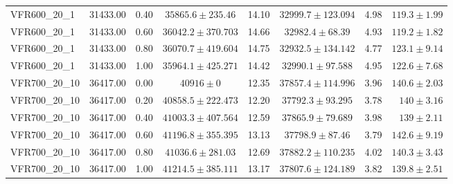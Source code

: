 \begin{longtable}{lrrccccr}
  VFR600\_20\_1 & 31433.00 & 0.40 & $35865.6 \pm 235.46$ & 14.10 & $32999.7 \pm 123.094$ & 4.98 & $119.3 \pm 1.99$ \\ 
  VFR600\_20\_1 & 31433.00 & 0.60 & $36042.2 \pm 370.703$ & 14.66 & $32982.4 \pm 68.39$ & 4.93 & $119.2 \pm 1.82$ \\ 
  VFR600\_20\_1 & 31433.00 & 0.80 & $36070.7 \pm 419.604$ & 14.75 & $32932.5 \pm 134.142$ & 4.77 & $123.1 \pm 9.14$ \\ 
  VFR600\_20\_1 & 31433.00 & 1.00 & $35964.1 \pm 425.271$ & 14.42 & $32990.1 \pm 97.588$ & 4.95 & $122.6 \pm 7.68$ \\ 
   \midrule
VFR700\_20\_10 & 36417.00 & 0.00 & $40916 \pm 0$ & 12.35 & $37857.4 \pm 114.996$ & 3.96 & $140.6 \pm 2.03$ \\ 
  VFR700\_20\_10 & 36417.00 & 0.20 & $40858.5 \pm 222.473$ & 12.20 & $37792.3 \pm 93.295$ & 3.78 & $140 \pm 3.16$ \\ 
  VFR700\_20\_10 & 36417.00 & 0.40 & $41003.3 \pm 407.564$ & 12.59 & $37865.9 \pm 79.689$ & 3.98 & $139 \pm 2.11$ \\ 
  VFR700\_20\_10 & 36417.00 & 0.60 & $41196.8 \pm 355.395$ & 13.13 & $37798.9 \pm 87.46$ & 3.79 & $142.6 \pm 9.19$ \\ 
  VFR700\_20\_10 & 36417.00 & 0.80 & $41036.6 \pm 281.03$ & 12.69 & $37882.2 \pm 110.235$ & 4.02 & $140.3 \pm 3.43$ \\ 
  VFR700\_20\_10 & 36417.00 & 1.00 & $41214.5 \pm 385.111$ & 13.17 & $37807.6 \pm 124.189$ & 3.82 & $139.8 \pm 2.51$ \\ 




 
\end{longtable}
